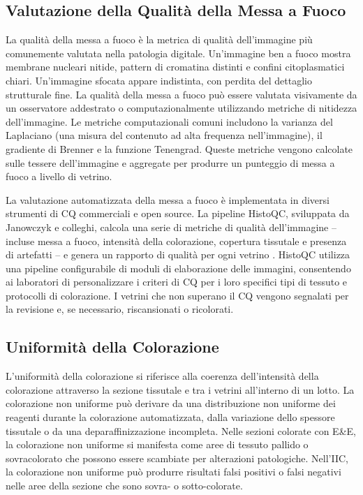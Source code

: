 \subsection{Valutazione della Qualità della Messa a Fuoco}

La qualità della messa a fuoco è la metrica di qualità dell'immagine più comunemente valutata
nella patologia digitale. Un'immagine ben a fuoco mostra membrane nucleari nitide, pattern di
cromatina distinti e confini citoplasmatici chiari. Un'immagine sfocata appare indistinta, con
perdita del dettaglio strutturale fine. La qualità della messa a fuoco può essere valutata
visivamente da un osservatore addestrato o computazionalmente utilizzando metriche di nitidezza
dell'immagine. Le metriche computazionali comuni includono la varianza del Laplaciano (una misura
del contenuto ad alta frequenza nell'immagine), il gradiente di Brenner e la funzione Tenengrad.
Queste metriche vengono calcolate sulle tessere dell'immagine e aggregate per produrre un punteggio
di messa a fuoco a livello di vetrino.

La valutazione automatizzata della messa a fuoco è implementata in diversi strumenti di CQ
commerciali e open source. La pipeline HistoQC, sviluppata da Janowczyk e colleghi, calcola una
serie di metriche di qualità dell'immagine -- incluse messa a fuoco, intensità della colorazione,
copertura tissutale e presenza di artefatti -- e genera un rapporto di qualità per ogni vetrino
\cite{janowczyk2019}. HistoQC utilizza una pipeline configurabile di moduli di elaborazione delle
immagini, consentendo ai laboratori di personalizzare i criteri di CQ per i loro specifici tipi
di tessuto e protocolli di colorazione. I vetrini che non superano il CQ vengono segnalati per
la revisione e, se necessario, riscansionati o ricolorati.

\subsection{Uniformità della Colorazione}

L'uniformità della colorazione si riferisce alla coerenza dell'intensità della colorazione
attraverso la sezione tissutale e tra i vetrini all'interno di un lotto. La colorazione non
uniforme può derivare da una distribuzione non uniforme dei reagenti durante la colorazione
automatizzata, dalla variazione dello spessore tissutale o da una deparaffinizzazione incompleta.
Nelle sezioni colorate con E\&E, la colorazione non uniforme si manifesta come aree di tessuto
pallido o sovracolorato che possono essere scambiate per alterazioni patologiche. Nell'IIC, la
colorazione non uniforme può produrre risultati falsi positivi o falsi negativi nelle aree della
sezione che sono sovra- o sotto-colorate.

